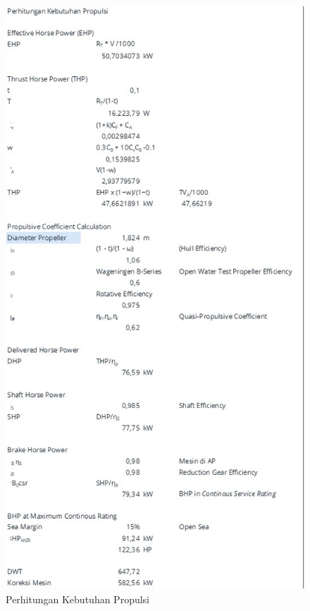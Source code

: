 \begin{figure}[!ht]
    \centering
    \includegraphics[width=0.95\linewidth,height=0.95\textheight,keepaspectratio]{lampiran/deskap-3.jpg}
    \caption*{Perhitungan Kebutuhan Propulsi}
\end{figure}

